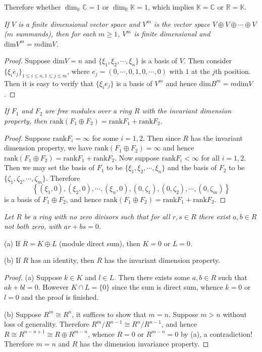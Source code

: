 Therefore whether $\dim_{\mathbb{K}}\mathbb{C}=1$ or $\dim_{\mathbb{R}}\mathbb{K}=1$, which implies $\mathbb{K}=\mathbb{C}$ or $\mathbb{R}=\mathbb{K}$.
\begin{problem}\em
If $V$ is a finite dimensional vector space and $V^m$ is the vector space $V\oplus V\oplus\cdots\oplus V$ ($m$ summands), then for each $m\ge 1$, $V^m$ is finite dimensional and $\mathrm{dim}V^m=m\mathrm{dim}V$.
\end{problem}
\begin{proof}
Suppose $\mathrm{dim}V=n$ and $\{\xi_1,\xi_2,\cdots,\xi_n\}$ is a basis of $V$. Then consider $\{\xi_ie_j\}_{1\le i\le n,1\le j\le m}$, where $e_j=(0,\cdots,0,1,0,\cdots,0)$ with $1$ at the $j$th position. Then it is easy to verify that $\{\xi_ie_j\}$ is a basis of $V^m$ and hence $\mathrm{dim}B^m=m\mathrm{dim}V$.
\end{proof}
\begin{problem}\em
If $F_1$ and $F_2$ are free modules over a ring $R$ with the invariant dimension property, then $\mathrm{rank}(F_1\oplus F_2)=\mathrm{rank}F_1+\mathrm{rank}F_2$.
\end{problem}
\begin{proof}
Suppose $\mathrm{rank}F_i=\infty$ for some $i=1,2$. Then since $R$ has the invariant dimension property, we have $\mathrm{rank}(F_1\oplus F_2)=\infty$ and hence $\mathrm{rank}(F_1\oplus F_2)=\mathrm{rank}F_1+\mathrm{rank}F_2$. Now suppose $\mathrm{rank}F_i<\infty$ for all $i=1,2$. Then we may set the basis of $F_1$ to be $\{\xi_1,\xi_2,\cdots,\xi_n\}$ and the basis of $F_2$ to be $\{\zeta_1,\zeta_2,\cdots,\zeta_m\}$. Therefore 
$$
\left\{ \left( \xi _1,0 \right) ,\left( \xi _2,0 \right) ,\cdots ,\left( \xi _n,0 \right) ,\left( 0,\zeta _1 \right) ,\left( 0,\zeta _2 \right) ,\cdots ,\left( 0,\zeta _m \right) \right\} 
$$
is a basis of $F_1\oplus F_2$, and hence $\mathrm{rank}(F_1\oplus F_2)=\mathrm{rank}F_1+\mathrm{rank}F_2$.
\end{proof}
\begin{problem}\em
Let $R$ be a ring with no zero divisors such that for all $r,s\in R$ there exist $a,b\in R$ not both zero, with $ar+bs=0$.\par
(a) If $R=K\oplus L$ (module direct sum), then $K=0$ or $L=0$.\par
(b) If $R$ has an identity, then $R$ has the invariant dimension property.
\end{problem}
\begin{proof}
(a) Suppose $k\in K$ and $l\in L$. Then there exists some $a,b\in R$ such that $ak+bl=0$. However $K\cap L=\{0\}$ since the sum is direct sum, whence $k=0$ or $l=0$ and the proof is finished.\par
(b) Suppose $R^m\cong R^n$, it suffices to show that $m=n$. Suppose $m>n$ without loss of generality. Therefore $R^m/R^{n-1}\cong R^n/R^{n-1}$, and hence $R\cong R^{n-n+1}\cong R\oplus R^{m-n}$, whence $R=0$ or $R^{m-n}=0$ by (a), a contradiction! Therefore $m=n$ and $R$ has the dimension invariance property.
\end{proof}

